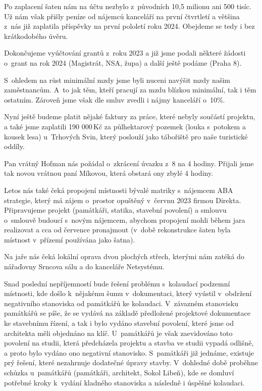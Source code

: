 \documentclass[11pt]{article}
\begin{document}
Po zaplacení šaten nám na účtu nezbylo z~původních 10,5 milionu ani 500 tisíc. Už nám však přišly peníze od nájemců kanceláří na první čtvrtletí a většina z~nás již zaplatila příspěvky na první pololetí roku 2024. Obejdeme se tedy i bez krátkodobého úvěru. 

Dokončujeme vyúčtování grantů z~roku 2023 a již jsme podali některé žádosti o~grant na rok 2024 (Magistrát, NSA, župa) a další ještě podáme (Praha 8). 

S~ohledem na růst minimální mzdy jsme byli nuceni navýšit mzdy našim zaměstnancům. A~to jak těm, kteří pracují za mzdu blízkou minimální, tak i těm ostatním. Zároveň jsme však dle smluv zvedli i nájmy kanceláří o~10\%.

Nyní ještě budeme platit nějaké faktury za práce, které nebyly součástí projektu, a také jsme zaplatili 190 000\,Kč za půlhektarový pozemek (louka s~potokem a kousek lesa) u~Trhových Svin, který poslouží jako tábořiště pro naše turistické oddíly.

Pan vrátný Hofman nás požádal o~zkrácení úvazku z~8 na 4 hodiny. Přijali jsme tak novou vrátnou paní Míkovou, která obstará ony zbylé 4 hodiny.

Letos nás také čeká propojení místnosti bývalé matriky s~nájemcem ABA strategie, který má zájem o~prostor opuštěný v~červnu 2023 firmou Direkta. Připravujeme projekt (památkáři, statika, stavební povolení) a smlouvu o~smlouvě budoucí s~novým nájemcem, abychom propojení mohli během jara realizovat a cca od července pronajmout (v~době rekonstrukce šaten byla místnost v~přízemí používána jako šatna).

Na jaře nás čeká lokální oprava dvou plochých střech, kterými nám zatéká do nářaďovny Srncova sálu a do kanceláře Netsystému. 

Snad poslední nepříjemností bude řešení problému s~kolaudací podzemní místnosti, kde došlo k~nějakému šumu v~dokumentaci, který vyústil v~obdržení negativního stanoviska od památkářů ke kolaudaci. V~závazném stanovisku památkářů se píše, že \luv{}se vydává na základě předložené projektové dokumentace ke stavebnímu řízení\ruv{}, a tak i bylo vydáno stavební povolení, které jsme od architekta měli objednáno na klíč. U~památkářů je však zaevidováno toto povolení na studii, která předcházela projektu a stavba ve studii vypadá odlišně, a proto bylo vydáno ono negativní stanovisko. S~památkáři již jednáme, existuje prý řešení, které nezahrnuje dodatečné úpravy stavby. V~dohledné době proběhne schůzka u~památkářů (památkáři, architekt, Sokol Libeň), kde se domluví potřebné kroky k~vydání kladného stanoviska a následně i úspěšné kolaudaci.
\end{document}
